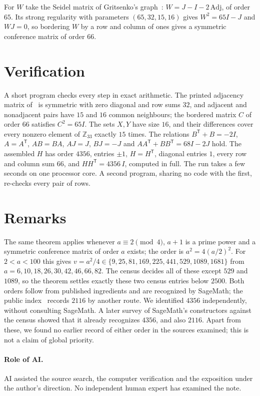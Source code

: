 \documentclass[10pt]{article}
\begin{document}
For $W$ take the Seidel matrix of Gritsenko's graph~\cite{G21}: $W=J-I-2\,\mathrm{Adj}$, of order $65$. Its strong regularity with parameters $(65,32,15,16)$ gives $W^2=65I-J$ and $WJ=0$, so bordering $W$ by a row and column of ones gives a symmetric conference matrix of order $66$.

\section{Verification}
A short program checks every step in exact arithmetic. The printed adjacency matrix of~\cite{G21} is symmetric with zero diagonal and row sums $32$, and adjacent and nonadjacent pairs have $15$ and $16$ common neighbours; the bordered matrix $C$ of order $66$ satisfies $C^2=65I$. The sets $X,Y$ have size $16$, and their differences cover every nonzero element of $\mathbb Z_{33}$ exactly $15$ times. The relations $B^{\mathsf T}+B=-2I$, $A=A^{\mathsf T}$, $AB=BA$, $AJ=J$, $BJ=-J$ and $AA^{\mathsf T}+BB^{\mathsf T}=68I-2J$ hold. The assembled $H$ has order $4356$, entries $\pm1$, $H=H^{\mathsf T}$, diagonal entries $1$, every row and column sum $66$, and $HH^{\mathsf T}=4356\,I$, computed in full. The run takes a few seconds on one processor core. A second program, sharing no code with the first, re-checks every pair of rows.

\section{Remarks}
The same theorem applies whenever $a\equiv2\pmod4$, $a+1$ is a prime power and a symmetric conference matrix of order $a$ exists; the order is $a^2=4(a/2)^2$. For $2<a<100$ this gives $v=a^2/4\in\{9,25,81,169,225,441,529,1089,1681\}$ from $a=6,10,18,26,30,42,46,66,82$. The census decides all of these except $529$ and $1089$, so the theorem settles exactly these two census entries below $2500$. Both orders follow from published ingredients and are recognized by SageMath; the public index~\cite{GSI} records $2116$ by another route. We identified $4356$ independently, without consulting SageMath. A later survey of SageMath's constructors against the census showed that it already recognizes $4356$, and also $2116$. Apart from these, we found no earlier record of either order in the sources examined; this is not a claim of global priority.

\paragraph{Role of AI.}
AI assisted the source search, the computer verification and the exposition under the author's direction. No independent human expert has examined the note.
\end{document}
